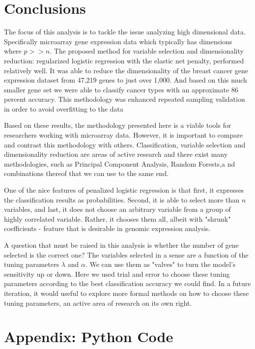 \documentclass[12pt,a4paper]{article}
\begin{document}
\section{Conclusions}
The focus of this analysis is to tackle the issue analyzing high dimensional data. Specifically microarray gene expression data which typically has dimensions where $p>>n$. The proposed method for variable selection and dimensionality reduction: regularized logistic regression with the elastic net penalty, performed relatively well. It was able to reduce the dimensionality of the breast cancer gene expression dataset from 47,219 genes to just over 1,000. And based on this much smaller gene set we were able to classify cancer types with an approximate 86 percent accuracy. This methodology was enhanced repeated sampling validation in order to avoid overfitting to the data\\
\par Based on these results, the methodology presented here is a viable tools for researchers working with microarray data. However, it is important to compare and contrast this methodology with others. Classification, variable selection and dimensionality reduction are areas of active research and there exist many methodologies, such as Principal Component Analysis, Random Forests,a nd combinations thereof that we can use to the same end.\\
\par One of the nice features of penalized logistic regression is that first, it expresses the classification results as probabilities. Second, it is able to select more than $n$ variables, and last, it does not choose an arbitrary variable from a group of highly correlated variable. Rather, it chooses them all, albeit with "shrunk" coefficients - feature that is desirable in genomic expression analysis. \\
\par A question that must be raised in this analysis is whether the number of gene selected is the correct one? The variables selected in a sense are a function of the tuning parameters $\lambda$ and $\alpha$. We can use them as "valves" to turn the model's sensitivity up or down. Here we used trial and error to choose these tuning parameters according to the best classification accuracy we could find. In a future iteration, it would useful to explore more formal methods on how to choose these tuning parameters, an active area of research on its own right.
\ 
\FloatBarrier
\pagebreak
\section{Appendix: Python Code}
\end{document}
